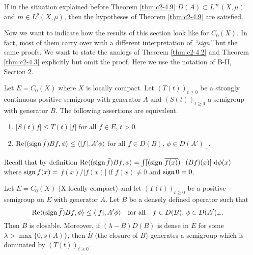 \begin{example}\label{ex:c2-4.11}
If in the situation explained before Theorem \ref{thm:c2-4.9}  
$D(A) \subset L^{\infty}(X,\mu)$ and $m \in L^{p}(X,\mu)$, then the hypotheses of Theorem \ref{thm:c2-4.9}   are satisfied.
\end{example}
Now we want to indicate how the results of this section look like for $C_{0}(X)$.
In fact, most of them carry over with a different interpretation of \emph{``sign''} but the same proofs.
We want to state the analogs of Theorem \ref{thm:c2-4.2}   and Theorem \ref{thm:c2-4.3}   explicitly but omit the proof.
Here we use the notation of B-II, Section 2.
\begin{theorem}\label{thm:c2-4.12}
Let $E = C_{0}(X)$ where $X$ is locally compact.
Let $(T(t))_{t \geq 0}$ be a strongly continuous positive semigroup with
generator $A$ and $(S(t))_{t \geq 0}$ a semigroup with generator $B$.
The following assertions are equivalent.
\begin{enumerate}[\upshape (a)]
\item \label{thm:c2-4.12-1}
$|S(t)f| \leq T(t)|f|$ for all $f \in E$, $t > 0$.
\item \label{thm:c2-4.12-2}
$\mathop{}\!\mathrm{Re}\langle(\operatorname{sign}  \bar{f})Bf,\phi\rangle \leq \langle|f|,A'\phi\rangle$ for all $f \in D(B)$, $\phi \in D(A')_{+}$.
\end{enumerate}
\end{theorem}
Recall that by definition
$\mathop{}\!\mathrm{Re}  \langle(\operatorname{sign}  \bar{f})Bf,\phi\rangle = \int [\text{(sign } \overline{f(x)})\cdot(Bf)(x)] \, \mathop{}\!\mathrm{d}{\phi(x)}$ where $\operatorname{sign}  f(x) =$
$f(x)/|f(x)|$ if $f(x) \neq 0$ and $\operatorname{sign}  0 = 0$.
\begin{theorem}\label{thm:c2-4.13}
Let $E = C_{0}(X)$ (X locally compact) and let $(T(t))_{t \geq 0}$
be a positive semigroup on $E$ with generator $A$.
Let $B$ be a densely defined operator such that
\begin{equation}\label{eq:c2-4.12}
\mathop{}\!\mathrm{Re}  \langle(\operatorname{sign}  \bar{f})Bf,\phi\rangle \leq \langle|f|,A'\phi\rangle \quad 
\text{for all} \quad f \in D(B),\, \phi \in D(A')_{+} .
\end{equation}
Then $B$ is closable.
Moreover, if $(\lambda - B)D(B)$ is dense in $E$ for some $\lambda > \max\{0,s(A)\}$, then $\overline{B}$ (the closure of $B$) generates a
semigroup which is dominated by $(T(t))_{t \geq 0}$.
\end{theorem}
